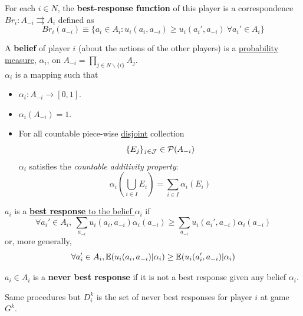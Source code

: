 \documentclass[11pt]{article}
\begin{document}
			\begin{definition}
				For each $i \in N$, the \textbf{best-response function} of this player is a correspondence $Br_i: A_{-i} \rightrightarrows A_i$ defined as
				\begin{equation}
					Br_i(a_{-i}) \equiv \{a_i \in A_i : u_i(a_i, a_{-i}) \geq u_i(a_i', a_{-i})\ \forall a_i' \in A_i \}
				\end{equation}
			\end{definition}
			
			\begin{definition}
				A \textbf{belief} of player $i$ (about the actions of the other players) is a \ul{probability measure}, $\alpha_i$, on $A_{-i}=\prod_{j \in N \backslash \{i\}} A_j$. \\
				$\alpha_i$ is a mapping such that
				\begin{itemize}
					\item $\alpha_i: A_{-i} \to [0,1]$.
					\item $\alpha_i(A_{-i}) = 1$.
					\item For all countable piece-wise \ul{disjoint} collection 
					\[
						\{E_j\}_{j\in \mathcal{{J}}} \in \mathcal{{P}}(A_{-i})
					\]
					$\alpha_i$ satisfies the \emph{countable additivity property}:
					\[
						\alpha_i(\bigcup_{i \in I} E_i) = \sum_{i \in I}\alpha_i(E_i)
					\]
				\end{itemize}
			\end{definition}
				
			\begin{definition}
				$a_i$ is a \ul{\textbf{best response} to the belief $\alpha_i$} if
				\begin{equation}
					\forall a_i' \in A_i,\ \sum_{a_{-i}} u_i(a_i, a_{-i}) \alpha_i(a_{-i}) \geq \sum_{a_{-i}} u_i(a_i', a_{-i}) \alpha_i(a_{-i})
				\end{equation}
				or, more generally,
				\begin{equation}
					\forall a'_i \in A_i, \mathbb{E}({u_i(a_i, a_{-i})|\alpha_i}) \geq \mathbb{E}({u_i(a_i', a_{-i})|\alpha_i})
				\end{equation}
			\end{definition}
			
			\begin{definition}
				$a_i \in A_i$ is a \textbf{never best response} if it is not a best response given any belief $\alpha_i$.
			\end{definition}
			
			\begin{corollary}
				 Same procedures but $D_i^k$ is the set of never best responses for player $i$ at game $G^k$.
			\end{corollary}
			
\end{document}
